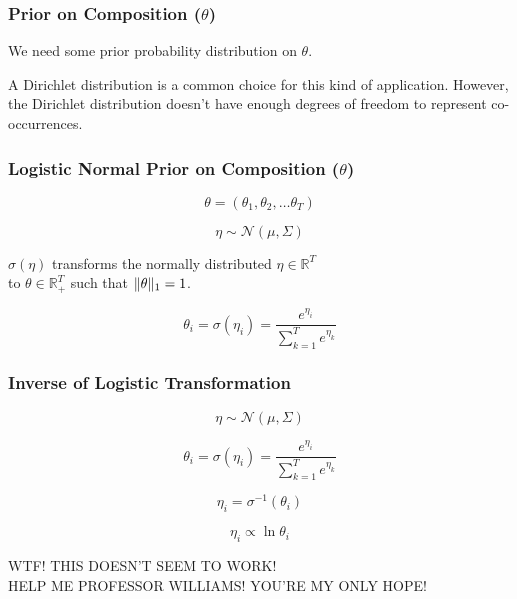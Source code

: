 \begin{frame}
  \frametitle{Prior on Composition ($\theta$)}
  \begin{center}
    We need some prior probability distribution on $\theta$.
    \vspace{0.3in}

    A Dirichlet distribution is a common choice for this kind of application.
    However, the Dirichlet distribution doesn't have enough degrees of freedom to represent co-occurrences.
  \end{center}
\end{frame}

\begin{frame}
  \frametitle{Logistic Normal Prior on Composition ($\theta$)}
  \begin{center}
    \begin{equation*}
      \theta = ( \theta_1, \theta_2, \dots \theta_T )
    \end{equation*}

    \begin{equation*}
      \eta \sim \mathcal{N}(\mu, \Sigma)
    \end{equation*}

    $\sigma(\eta)$ transforms the normally distributed $\eta \in \mathbb{R}^T$ \\
    to $\theta \in \mathbb{R}_+^T$ such that $\lVert\theta\rVert_1 = 1$.

    \begin{equation*}
      \theta_i = \sigma(\eta_i) = \frac{e^{\eta_i}}{\sum_{k=1}^{T}e^{\eta_k}}
    \end{equation*}
  \end{center}
\end{frame}

\begin{frame}
  \frametitle{Inverse of Logistic Transformation}
  \begin{center}
    \begin{equation*}
      \eta \sim \mathcal{N}(\mu, \Sigma)
    \end{equation*}

    \begin{equation*}
      \theta_i = \sigma(\eta_i) = \frac{e^{\eta_i}}{\sum_{k=1}^{T}e^{\eta_k}}
    \end{equation*}

    \begin{equation*}
      \eta_i = \sigma^{-1}(\theta_i)
    \end{equation*}

    \begin{equation*}
      \eta_i \propto \ln \theta_i
    \end{equation*}

    WTF! THIS DOESN'T SEEM TO WORK! \\
    HELP ME PROFESSOR WILLIAMS! YOU'RE MY ONLY HOPE!
  \end{center}
\end{frame}

